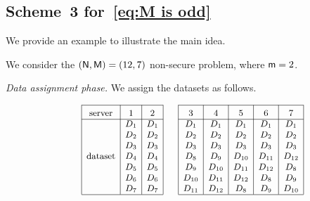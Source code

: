 \documentclass[conference,letterpaper]{IEEEtran}
\begin{document}
\subsection{\texorpdfstring{Scheme~3 for~\eqref{eq:M is odd}}{Scheme 3 for Eq. (Y)}}
\label{sub:M is odd}
We provide an example to illustrate the main idea.
\begin{example} \rm
\label{ex:scheme 3 example}
We consider the $({\sf N}, {\sf M}) = (12, 7)$ non-secure problem, where ${\sf m} = 2$.

{\it Data assignment phase.}
We assign the datasets as follows.  


\begin{align*}
{\small 
\begin{array}{rl|c|c|c|}\cline{3-3}\cline{4-4}\cline{5-5}
&&\rule{0pt}{1.2em}\mbox{server}&\rule{0pt}{1.2em}\mbox{\textnormal{1}}  &\rule{0pt}{1.2em}\mbox{\textnormal{2}} \\ \cline{3-3}\cline{4-4}\cline{5-5}
&& &D_1 & D_1 \\
&& &D_2 & D_2  \\
&& &D_3 & D_3 \\
&& \mbox{dataset}&D_4 & D_4  \\
&& &D_5 & D_5 \\
&& &D_6 & D_6 \\
&& &D_7 & D_7\\
\cline{3-3}\cline{4-4}\cline{5-5}
\end{array}
\hspace{-0.5em} %
\begin{array}{rl|c|c|c|c|c|}\cline{3-3}\cline{4-4}\cline{5-5}\cline{6-6}\cline{7-7}
&&\rule{0pt}{1.2em}\mbox{\textnormal{3}} & \rule{0pt}{1.2em}\mbox{\textnormal{4}} & \rule{0pt}{1.2em}\mbox{\textnormal{5}} & \rule{0pt}{1.2em}\mbox{\textnormal{6}} & \rule{0pt}{1.2em}\mbox{\textnormal{7}} \\ \cline{3-3}\cline{4-4}\cline{5-5}\cline{6-6}\cline{7-7}
&&  D_1 & D_1 & D_1 & D_1 & D_1\\
&&   D_2 & D_2 & D_2 & D_2 & D_2 \\
&&  D_3 & D_3 & D_3 & D_3 & D_3\\
&&  D_8 & D_9 & D_{10} & D_{11} & D_{12} \\
&&  D_9 & D_{10} & D_{11} & D_{12} & D_8\\
&&  D_{10} & D_{11} & D_{12} & D_8 & D_9\\
&&  D_{11} & D_{12} & D_8 & D_9 & D_{10}\\
\cline{3-3}\cline{4-4}\cline{5-5}\cline{6-6}\cline{7-7}
\end{array}
}
\end{align*}



\end{example}
\end{document}
